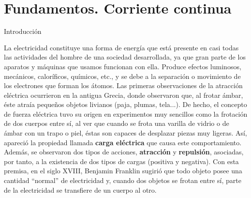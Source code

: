 \documentclass[11pt]{book} %
\makeatletter
\numberwithin{dummy}{section}
\theoremstyle{ocrenumbox}
\theoremstyle{blacknumex}
\theoremstyle{blacknumbox}
\theoremstyle{ocrenum}
\renewcommand{\section}{\@startsection{section}{1}{\z@}
{-4ex \@plus -1ex \@minus -.4ex}
{1ex \@plus.2ex }
{\normalfont\large\sffamily\bfseries}}
\newlength\esp
\newcommand{\thechapterimage}{}%
\newcommand{\chapterimage}[1]{\renewcommand{\thechapterimage}{#1}}%
\makeatother
\begin{document}
	\chapterimage{imagen_t1.jpg} %
	\chapter{Fundamentos. Corriente continua}\label{chap.cc}
	
	\setcounter{page}{1}
	
	
	\section{Introducción}
	
	La electricidad constituye una forma de energía que está presente en casi todas las actividades del hombre de una sociedad desarrollada, ya que gran parte de los aparatos y máquinas que usamos funcionan con ella. Produce efectos luminosos, mecánicos, caloríficos, químicos, etc., y se debe a la separación o movimiento de los electrones que forman los átomos. Las primeras observaciones de la atracción eléctrica ocurrieron en la antigua Grecia, donde observaron que, al frotar ámbar, éste atraía pequeños objetos livianos (paja, plumas, tela...). De hecho, el concepto de fuerza eléctrica tuvo su origen en experimentos muy sencillos como la frotación de dos cuerpos entre sí, al ver que cuando se frota una varilla de vidrio o de ámbar con un trapo o piel, éstas son capaces de desplazar piezas muy ligeras. Así, apareció la propiedad llamada \textbf{carga eléctrica} que causa este comportamiento. Además, se observaron dos tipos de acciones, \textbf{atracción} y \textbf{repulsión}, asociadas, por tanto, a la existencia de dos tipos de cargas (positiva y negativa). Con esta premisa, en el siglo XVIII, Benjamin Franklin sugirió que todo objeto posee una cantidad ``normal'' de electricidad y, cuando dos objetos se frotan entre sí, parte de la electricidad se transfiere de un cuerpo al otro. 
	
\end{document}

